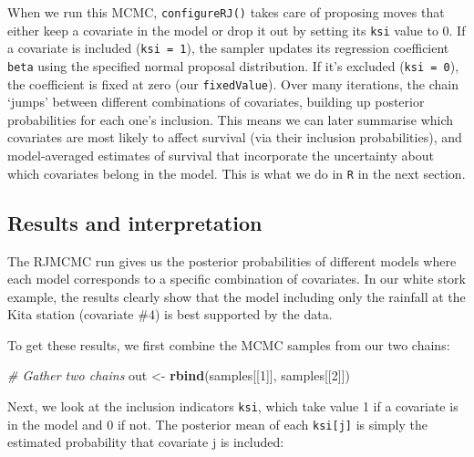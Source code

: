 \documentclass[
  12pt,
]{krantz}
\newenvironment{Shaded}{\begin{snugshade}}{\end{snugshade}}
\newcommand{\CommentTok}[1]{\textcolor[rgb]{0.56,0.35,0.01}{\textit{#1}}}
\newcommand{\DecValTok}[1]{\textcolor[rgb]{0.00,0.00,0.81}{#1}}
\newcommand{\FunctionTok}[1]{\textcolor[rgb]{0.13,0.29,0.53}{\textbf{#1}}}
\newcommand{\NormalTok}[1]{#1}
\newcommand{\OtherTok}[1]{\textcolor[rgb]{0.56,0.35,0.01}{#1}}
\begin{document}
When we run this MCMC, \texttt{configureRJ()} takes care of proposing moves that either keep a covariate in the model or drop it out by setting its \texttt{ksi} value to 0. If a covariate is included (\texttt{ksi\ =\ 1}), the sampler updates its regression coefficient \texttt{beta} using the specified normal proposal distribution. If it's excluded (\texttt{ksi\ =\ 0}), the coefficient is fixed at zero (our \texttt{fixedValue}). Over many iterations, the chain `jumps' between different combinations of covariates, building up posterior probabilities for each one's inclusion. This means we can later summarise which covariates are most likely to affect survival (via their inclusion probabilities), and model-averaged estimates of survival that incorporate the uncertainty about which covariates belong in the model. This is what we do in \texttt{R} in the next section.

\subsection{Results and interpretation}\label{results-and-interpretation}

The RJMCMC run gives us the posterior probabilities of different models where each model corresponds to a specific combination of covariates. In our white stork example, the results clearly show that the model including only the rainfall at the Kita station (covariate \#4) is best supported by the data.

To get these results, we first combine the MCMC samples from our two chains:

\begin{Shaded}
\begin{Highlighting}[]
\CommentTok{\# Gather two chains}
\NormalTok{out }\OtherTok{\textless{}{-}} \FunctionTok{rbind}\NormalTok{(samples[[}\DecValTok{1}\NormalTok{]], samples[[}\DecValTok{2}\NormalTok{]])}
\end{Highlighting}
\end{Shaded}

Next, we look at the inclusion indicators \texttt{ksi}, which take value 1 if a covariate is in the model and 0 if not. The posterior mean of each \texttt{ksi{[}j{]}} is simply the estimated probability that covariate j is included:
\end{document}
